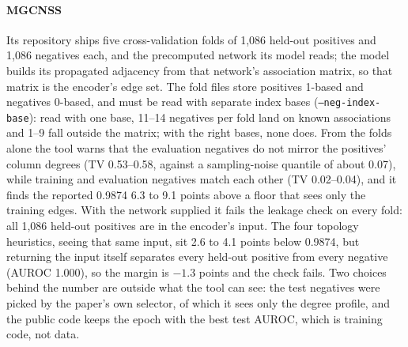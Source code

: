 \documentclass[review]{elsarticle}
\begin{document}
\paragraph{MGCNSS} Its repository ships five cross-validation folds of 1,086 held-out positives and 1,086
negatives each, and the precomputed network its model reads; the model builds its propagated adjacency from
that network's association matrix, so that matrix is the encoder's edge set. The fold files store positives
1-based and negatives 0-based, and must be read with separate index bases (\texttt{--neg-index-base}): read
with one base, 11--14 negatives per fold land on known associations and 1--9 fall outside the matrix; with
the right bases, none does. From the folds alone the tool warns that the evaluation negatives do not mirror
the positives' column degrees (TV 0.53--0.58, against a sampling-noise quantile of about 0.07), while
training and evaluation negatives match each other (TV 0.02--0.04), and it finds the reported 0.9874 6.3 to
9.1 points above a floor that sees only the training edges. With the network supplied it fails the leakage
check on every fold: all 1,086 held-out positives are in the encoder's input. The four topology heuristics,
seeing that same input, sit 2.6 to 4.1 points below 0.9874, but returning the input itself separates every
held-out positive from every negative (AUROC 1.000), so the margin is $-1.3$ points and the check fails.
Two choices behind the number are outside what the tool can see: the test negatives were picked by the
paper's own selector, of which it sees only the degree profile, and the public code keeps the epoch with the
best test AUROC, which is training code, not data.
\end{document}
